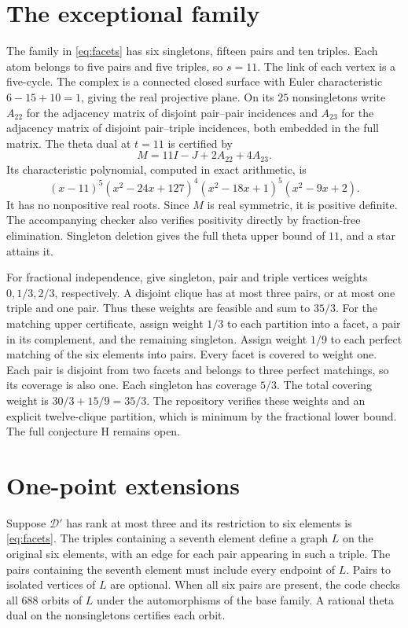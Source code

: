 \documentclass[10pt]{article}
\begin{document}
\section{The exceptional family}
The family in \eqref{eq:facets} has six singletons, fifteen pairs and ten
triples. Each atom belongs to five pairs and five triples, so $s=11$.
The link of each vertex is a five-cycle. The complex is a connected closed
surface with Euler characteristic $6-15+10=1$, giving the real projective plane.
On its $25$ nonsingletons write $A_{22}$ for the adjacency matrix of
disjoint pair--pair incidences and $A_{23}$ for the adjacency matrix of
disjoint pair--triple incidences, both embedded in the full matrix. The
theta dual at $t=11$ is certified by
\[
M=11I-J+2A_{22}+4A_{23}.
\]
Its characteristic polynomial, computed in exact arithmetic, is
\[
(x-11)^5(x^2-24x+127)^4(x^2-18x+1)^5(x^2-9x+2).
\]
It has no nonpositive real roots. Since $M$ is real symmetric, it is
positive definite. The accompanying checker also verifies positivity
directly by fraction-free elimination. Singleton deletion gives the full
theta upper bound of $11$, and a star attains it.

For fractional independence, give singleton, pair and triple vertices
weights $0,1/3,2/3$, respectively. A disjoint clique has at most three
pairs, or at most one triple and one pair. Thus these weights are feasible
and sum to $35/3$. For the matching upper certificate, assign weight
$1/3$ to each partition into a facet, a pair in its complement, and the
remaining singleton. Assign weight $1/9$ to each perfect matching of the
six elements into pairs. Every facet is covered to weight one. Each pair
is disjoint from two facets and belongs to three perfect matchings, so its
coverage is also one. Each singleton has coverage $5/3$. The total
covering weight is $30/3+15/9=35/3$. The repository verifies these weights
and an explicit twelve-clique partition, which is minimum by the
fractional lower bound. The full conjecture H remains open.

\newpage
\section{One-point extensions}
Suppose $\mathcal D'$ has rank at most three and its restriction to six
elements is \eqref{eq:facets}. The triples containing a seventh element
define a graph $L$ on the original six elements, with an edge for each
pair appearing in such a triple. The pairs containing the seventh element
must include every endpoint of $L$. Pairs to isolated vertices of $L$
are optional. When all six pairs are present, the code checks all
$688$ orbits of $L$ under the automorphisms of the base family. A rational
theta dual on the nonsingletons certifies each orbit.
\end{document}
